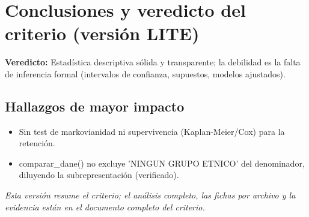 \section{Conclusiones y veredicto del criterio (versión LITE)}

\begin{tcolorbox}[hallazgo]
\textbf{Veredicto:} Estadística descriptiva sólida y transparente; la debilidad es la falta de inferencia formal (intervalos de confianza, supuestos, modelos ajustados).

\end{tcolorbox}

\subsection{Hallazgos de mayor impacto}

\begin{itemize}
  \item Sin test de markovianidad ni supervivencia (Kaplan-Meier/Cox) para la retención.
  \item comparar\_dane() no excluye 'NINGUN GRUPO ETNICO' del denominador, diluyendo la subrepresentación (verificado).
\end{itemize}

\noindent\textit{Esta versión resume el criterio; el análisis completo, las
fichas por archivo y la evidencia están en el documento completo del criterio.}
